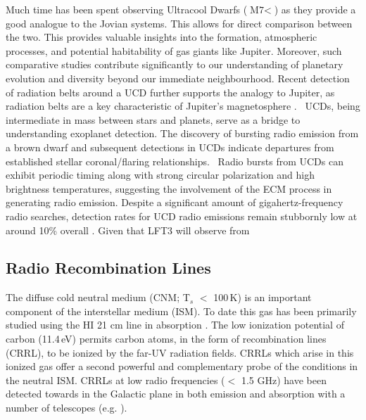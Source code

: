 Much time has been spent observing Ultracool Dwarfs ($\text{M7} <$) as they provide a good analogue to the Jovian systems. This allows for direct comparison between the two.  This provides valuable insights into the formation, atmospheric processes, and potential habitability of gas giants like Jupiter. Moreover, such comparative studies contribute significantly to our understanding of planetary evolution and diversity beyond our immediate neighbourhood. Recent detection of radiation belts around a UCD further supports the analogy to Jupiter, as radiation belts are a key characteristic of Jupiter's magnetosphere \citep{joe_nature_review}. \ UCDs, being intermediate in mass between stars and planets, serve as a bridge to understanding exoplanet detection. The discovery of bursting radio emission from a brown dwarf and subsequent detections in UCDs indicate departures from established stellar coronal/flaring relationships. \ Radio bursts from UCDs can exhibit periodic timing \citep{hallinan_rotational_2006} along with strong circular polarization and high brightness temperatures, suggesting the involvement of the ECM process in generating radio emission. Despite a significant amount of gigahertz-frequency radio searches, detection rates for UCD radio emissions remain stubbornly low at around 10\% overall \citep{lynch_radio_2016}. Given that LFT3 will observe from 


\subsection{Radio Recombination Lines}

The diffuse cold neutral medium (CNM; T$_{s}$ $<$ 100\,K) is an important component of the interstellar medium (ISM). To date this gas has been primarily studied using the HI 21 cm line in absorption \citep{Dickey_1990}. The low ionization potential of carbon (11.4\,eV) permits carbon atoms, in the form of recombination lines (CRRL), to be ionized by the far-UV radiation fields. CRRLs which arise in this ionized gas offer a second powerful and complementary probe of the conditions in the neutral ISM. CRRLs at low radio frequencies ($<$ 1.5 GHz) have been detected towards in the Galactic plane in both emission and absorption with a number of telescopes (e.g. \citealt{Kantharia_2001,Salas_2019}). 

